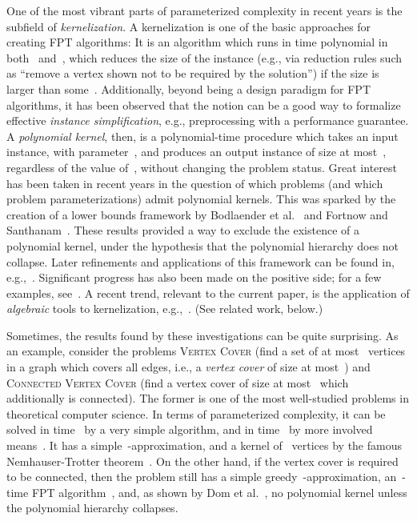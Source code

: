 \documentclass[a4paper,11pt]{article}
\begin{document}
One of the most vibrant parts of parameterized complexity in recent years is the subfield
of \emph{kernelization}. A kernelization is one of the basic approaches for creating FPT
algorithms: It is an algorithm which runs in time polynomial in both~ and~, which
reduces the size of the instance (e.g., via reduction rules such as ``remove a vertex
shown not to be required by the solution'') if the size is larger than some~. 
Additionally, beyond being a design paradigm for FPT algorithms, it has been observed that the notion
can be a good way to formalize effective \emph{instance simplification}, e.g.,
preprocessing with a performance guarantee. A \emph{polynomial kernel}, then, is a
polynomial-time procedure which takes an input instance, with parameter~, and produces
an output instance of size at most~, regardless of the value of~, without
changing the problem status. Great interest has been taken in recent years in the question
of which problems (and which problem parameterizations) admit polynomial kernels. 
This was sparked by the creation of a lower bounds framework by Bodlaender et
al.~\cite{BodlaenderDFH09} and Fortnow and Santhanam~\cite{FortnowS11}. These results
provided a way to exclude the existence of a polynomial kernel, under the hypothesis that
the polynomial hierarchy does not collapse. Later refinements and applications of this
framework can be found in,
e.g.,~\cite{DellvM10,BodlaenderJK11,DellM12,HermelinW12,Drucker12,DomLS09,CyganKPPW12}.  
Significant progress has also been made on the positive side; for a few examples,
see~\cite{BodlaenderFLPST09,Thomasse10,FominLST10}. A recent trend, relevant to the
current paper, is the application of \emph{algebraic} tools to kernelization,
e.g.,~\cite{KratschW12a,KratschW12b}. (See related work, below.)

Sometimes, the results found by these investigations can be quite surprising. As an
example, consider the problems \textsc{Vertex Cover} (find a set of at most~ vertices
in a graph which covers all edges, i.e., a \emph{vertex cover} of size at most~) and
\textsc{Connected Vertex Cover} (find a vertex cover of size at most~ which
additionally is connected). The former is one of the most well-studied problems in
theoretical computer science. In terms of parameterized complexity, it can be solved in
time~ by a very simple algorithm, and in time~ by more
involved means~\cite{ChenKX10}. It has a simple~-approximation, and a kernel of~
vertices by the famous Nemhauser-Trotter theorem~\cite{NemhauserT75}. On the other hand,
if the vertex cover is required to be connected, then the problem still has a simple
greedy~-approximation, an~-time FPT algorithm~\cite{CyganNPPvRW11}, and, as
shown by Dom et al.~\cite{DomLS09}, no polynomial kernel unless the polynomial hierarchy
collapses.
\end{document}

